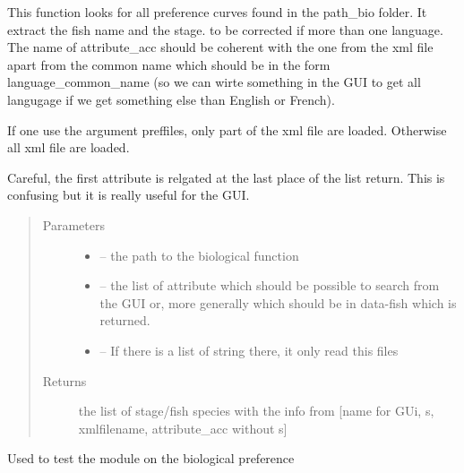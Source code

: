 \documentclass[letterpaper,10pt,english]{sphinxmanual}
\begin{document}
\begin{fulllineitems}
\label{\detokenize{index:src.bio_info.load_xml_name}}
This function looks for all preference curves found in the path\_bio folder. It extract the fish name and the stage.
to be corrected if more than one language. The name of attribute\_acc should be coherent with the one from the xml
file apart from the common name which should be in the form language\_common\_name (so we can wirte something in the
GUI to get all langugage if we get something else than English or French).

If one use the argument preffiles, only part of the xml file are loaded. Otherwise all xml file are loaded.

Careful, the first attribute is relgated at the last place of the list return. This is confusing but it is really
useful for the GUI.
\begin{quote}\begin{description}
\item[{Parameters}] \leavevmode\begin{itemize}
\item {} 
 -- the path to the biological function

\item {} 
 -- the list of attribute which should be possible to search from the GUI or, more generally
which should be in data-fish which is returned.

\item {} 
 -- If there is a list of string there, it only read this files

\end{itemize}

\item[{Returns}] \leavevmode
the list of stage/fish species with the info from {[}name for GUi, s, xmlfilename, attribute\_acc without s{]}

\end{description}\end{quote}

\end{fulllineitems}


\begin{fulllineitems}
\label{\detokenize{index:src.bio_info.main}}
Used to test the module on the biological preference

\end{fulllineitems}
\end{document}
